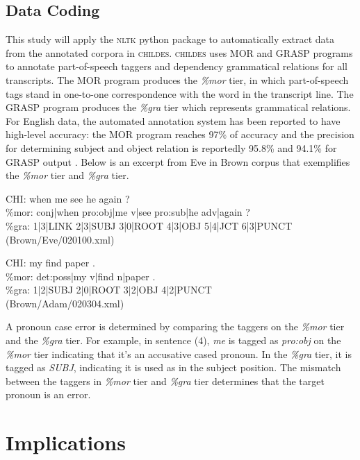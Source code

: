 \documentclass[a4paper,12pt]{article}
\begin{document}
\subsection{Data Coding}
This study will apply the \textsc{nltk} python package to automatically extract data from the annotated corpora in \textsc{childes}. \textsc{childes} uses MOR and GRASP programs to annotate part-of-speech taggers and dependency grammatical relations for all transcripts. The MOR program produces the \textit{\%mor} tier, in which part-of-speech tags stand in one-to-one correspondence with the word in the transcript line. The GRASP program produces the \textit{\%gra} tier which represents grammatical relations. For English data, the automated annotation system has been reported to have high-level accuracy: the MOR program reaches 97\% of accuracy and the precision for determining subject and object relation is reportedly 95.8\% and 94.1\% for GRASP output \citep{macwhinney2012morphosyntactic,sagae2010morphosyntactic}.  Below is an excerpt from Eve in Brown corpus that exemplifies the \textit{\%mor} tier and \textit{\%gra} tier.
\begin{exe}
\ex \gll *CHI: when me see he again ?\\
\%mor: conj|when pro:obj|me v|see pro:sub|he adv|again ? \\
\%gra: 1|3|LINK 2|3|SUBJ 3|0|ROOT 4|3|OBJ 5|4|JCT 6|3|PUNCT \\
(Brown/Eve/020100.xml)

\ex \gll *CHI:	my find paper .\\
	\%mor:	det:poss|my v|find n|paper .\\
	\%gra:	1|2|SUBJ 2|0|ROOT 3|2|OBJ 4|2|PUNCT\\
(Brown/Adam/020304.xml)
\end{exe}

A pronoun case error is determined by comparing the taggers on the \textit{\%mor} tier and the \textit{\%gra} tier. For example, in sentence (4), \textit{me} is tagged as \textit{pro:obj} on the \textit{\%mor} tier indicating that it's an accusative cased pronoun. In the  \textit{\%gra} tier, it is tagged as \textit{SUBJ}, indicating it is used as in the subject position. The mismatch between the taggers in \textit{\%mor} tier and \textit{\%gra} tier determines that the target pronoun is an error. 

\section{Implications}
\end{document}
